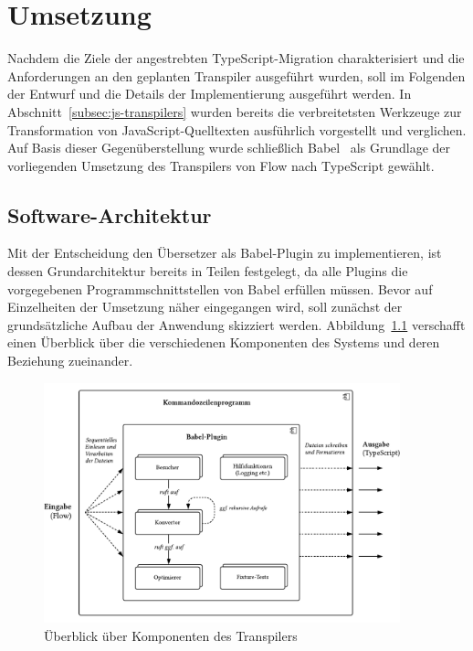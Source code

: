 \chapter{Umsetzung}
\label{chap:implementation}

Nachdem die Ziele der angestrebten TypeScript-Migration charakterisiert und die Anforderungen an den geplanten Transpiler ausgeführt wurden, soll im Folgenden der Entwurf und die Details der Implementierung ausgeführt werden. In Abschnitt~\ref{subsec:js-transpilers} wurden bereits die verbreitetsten Werkzeuge zur Transformation von JavaScript-Quelltexten ausführlich vorgestellt und verglichen. Auf Basis dieser Gegenüberstellung wurde schließlich Babel~\autocite{BABEL} als Grundlage der vorliegenden Umsetzung des Transpilers von Flow nach TypeScript gewählt.

\section{Software-Architektur}

Mit der Entscheidung den Übersetzer als Babel-Plugin zu implementieren, ist dessen Grundarchitektur bereits in Teilen festgelegt, da alle Plugins die vorgegebenen Programmschnittstellen von Babel erfüllen müssen. Bevor auf Einzelheiten der Umsetzung näher eingegangen wird, soll zunächst der grundsätzliche Aufbau der Anwendung skizziert werden. Abbildung~\ref{fig:architecture-overview} verschafft einen Überblick über die verschiedenen Komponenten des Systems und deren Beziehung zueinander.

\begin{figure}[tbp]
  \centering
  \includegraphics[width=0.92\textwidth]{src/4_Umsetzung/fig/architecture-overview.pdf}
	\caption{Überblick über Komponenten des Transpilers}
	\label{fig:architecture-overview}
\end{figure}

